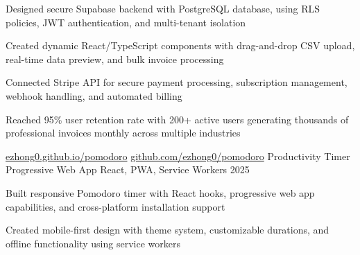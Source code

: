 \documentclass[12pt, letterpaper]{russell}
\begin{document}
\begin{cventries}
{\begin{cvitems}
        \item {Designed secure Supabase backend with PostgreSQL database, using RLS policies, JWT authentication, and multi-tenant isolation}
        \item {Created dynamic React/TypeScript components with drag-and-drop CSV upload, real-time data preview, and bulk invoice processing}
        \item {Connected Stripe API for secure payment processing, subscription management, webhook handling, and automated billing}
        \item {Reached 95\% user retention rate with 200+ active users generating thousands of professional invoices monthly across multiple industries}
      \end{cvitems}
    }
    \cvprojectinline
    {\href{https://ezhong0.github.io/pomodoro/}{ezhong0.github.io/pomodoro} \textbar{} \href{https://github.com/ezhong0/pomodoro}{github.com/ezhong0/pomodoro}} %
    {Productivity Timer Progressive Web App} %
    {React, PWA, Service Workers} %
    {2025} %
    {
      \begin{cvitems}
        \item {Built responsive Pomodoro timer with React hooks, progressive web app capabilities, and cross-platform installation support}
        \item {Created mobile-first design with theme system, customizable durations, and offline functionality using service workers}
      \end{cvitems}
    }
\vspace{0.2cm}
\end{cventries}

\end{document}
